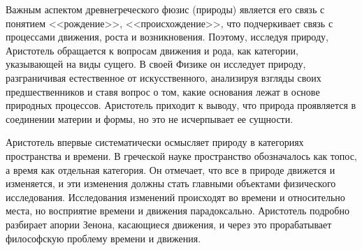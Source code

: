 
Важным аспектом древнегреческого фюзис (природы) является его связь с понятием <<рождение>>, <<происхождение>>, что подчеркивает связь с процессами движения, роста и возникновения. Поэтому, исследуя природу, Аристотель обращается к вопросам движения и рода, как категории, указывающей на виды сущего. В своей Физике он исследует природу, разграничивая естественное от искусственного, анализируя взгляды своих предшественников и ставя вопрос о том, какие основания лежат в основе природных процессов. Аристотель приходит к выводу, что природа проявляется в соединении материи и формы, но это не исчерпывает ее сущности.


Аристотель впервые систематически осмысляет природу в категориях пространства и времени. В греческой науке пространство обозначалось как топос, а время как отдельная категория. Он отмечает, что все в природе движется и изменяется, и эти изменения должны стать главными объектами физического исследования. Исследования изменений происходят во времени и относительно места, но восприятие времени и движения парадоксально. Аристотель подробно разбирает апории Зенона, касающиеся движения, и через это прорабатывает философскую проблему времени и движения.

